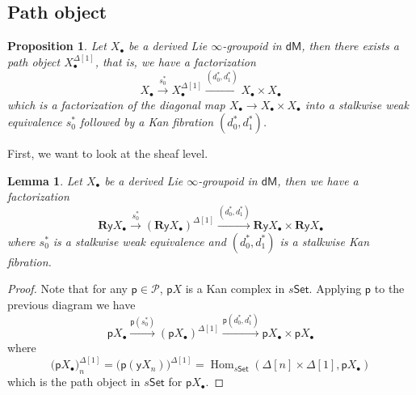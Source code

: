 \documentclass[12pt]{amsart}
\newtheorem{lem}[thm]{Lemma}
\newtheorem{prop}[thm]{Proposition}
\theoremstyle{definition}
\theoremstyle{remark}
\numberwithin{equation}{section}
\newcommand{\BR}{{\mathbf R}}
\newcommand{\1}{{\mathbb{1}}}
\newcommand{\y}{\mathsf{y}}
\newcommand{\p}{\mathsf{p}}
\newcommand{\po}{\mathcal{P}}
\newcommand{\set}{\mathsf{Set}}
\newcommand{\dm}{\mathsf{dM}}
\newcommand{\Hom}{\operatorname{Hom}}
\begin{document}
\subsection{Path object}
\begin{prop}\label{path}
	Let $X_{\bullet}$ be a derived Lie $\infty$-groupoid in $\dm$, then there exists a path object $X^{\Delta[1]}_{\bullet}$, that is, we have a factorization
	\begin{equation*}
	X_{\bullet}\stackrel{s^{*}_0}{\longrightarrow} X^{\Delta[1]}_{\bullet} \stackrel{(d^{*}_0, d^*_1)}{\longrightarrow} X_{\bullet} \times X_{\bullet}
	\end{equation*}
	which is a factorization of the diagonal map $X_{\bullet}\to X_{\bullet}\times X_{\bullet}$ into a stalkwise weak equivalence $s^{*}_0$ followed by a Kan fibration $(d^{*}_0, d^*_1)$.
\end{prop}

First, we want to look at the sheaf level. 
\begin{lem}
	Let $X_{\bullet}$ be a derived Lie $\infty$-groupoid in $\dm$, then we have a factorization
	\begin{equation*}
	\BR \y X_{\bullet}\stackrel{s^{*}_0}{\longrightarrow} (\BR\y X_{\bullet})^{\Delta[1]} \stackrel{(d^{*}_0, d^*_1)}{\longrightarrow} \BR\y X_{\bullet} \times \BR\y X_{\bullet}
	\end{equation*}
	where $s^*_0$ is a stalkwise weak equivalence and $(d^{*}_0, d^*_1)$ is a stalkwise Kan fibration.
\end{lem}
\begin{proof}
	Note that for any $\p\in \po$, $\p X$ is a Kan complex in $s\set$. Applying $\p$ to the previous diagram we have
	\begin{equation*}
	\p X_{\bullet}\stackrel{\p (s^{*}_0)}{\longrightarrow} (\p X_{\bullet})^{\Delta[1]} \stackrel{\p(d^{*}_0, d^*_1)}{\longrightarrow} \p X_{\bullet} \times \p X_{\bullet}
	\end{equation*}
	where $$\big(\p  X_{\bullet}\big)_n^{\Delta[1]}=\big(\p (\y X_n)\big)^{\Delta[1]}= \Hom_{s\set} (\Delta[n] \times \Delta[1], \p  X_{\bullet})$$
	which is the path object in $s\set$ for $\p X_{\bullet}$.
	\end{proof}
\end{document}
